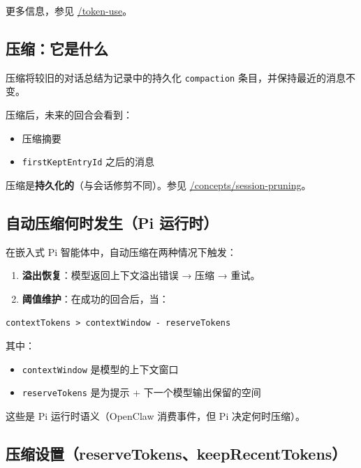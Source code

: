 更多信息，参见 \href{/reference/token-use}{/token-use}。

\hrulefill


\subsection{压缩：它是什么}


压缩将较旧的对话总结为记录中的持久化 \texttt{compaction} 条目，并保持最近的消息不变。

压缩后，未来的回合会看到：

\begin{itemize}
  \item 压缩摘要
  \item \texttt{firstKeptEntryId} 之后的消息
\end{itemize}


压缩是\textbf{持久化的}（与会话修剪不同）。参见 \href{/concepts/session-pruning}{/concepts/session-pruning}。

\hrulefill


\subsection{自动压缩何时发生（Pi 运行时）}


在嵌入式 Pi 智能体中，自动压缩在两种情况下触发：

\begin{enumerate}
  \item \textbf{溢出恢复}：模型返回上下文溢出错误 → 压缩 → 重试。
  \item \textbf{阈值维护}：在成功的回合后，当：
\end{enumerate}


\texttt{contextTokens > contextWindow - reserveTokens}

其中：

\begin{itemize}
  \item \texttt{contextWindow} 是模型的上下文窗口
  \item \texttt{reserveTokens} 是为提示 + 下一个模型输出保留的空间
\end{itemize}


这些是 Pi 运行时语义（OpenClaw 消费事件，但 Pi 决定何时压缩）。

\hrulefill


\subsection{压缩设置（reserveTokens、keepRecentTokens）}


